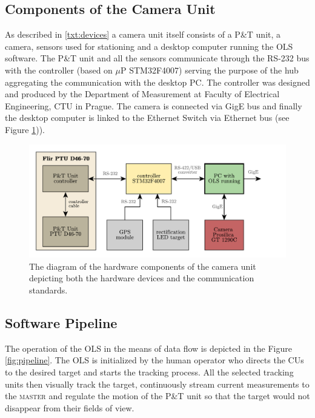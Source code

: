 \subsection{Components of the Camera Unit} \label{txt:components_of_cu}

As described in \ref{txt:devices} a camera unit itself consists of a P\&T unit, a camera, sensors used for stationing and a desktop computer running the OLS software. The P\&T unit and all the sensors communicate through the RS-232 bus with the controller (based on $\mu$P STM32F4007) serving the purpose of the hub aggregating the communication with the desktop PC. The controller was designed and produced by the Department of Measurement at Faculty of Electrical Engineering, CTU in Prague. The camera is connected via GigE bus and finally the desktop computer is linked to the Ethernet Switch via Ethernet bus (see Figure \ref{fig:hw_camera_unit})).

\begin{figure}[htb]
	\centering
	\includegraphics[width=0.8\linewidth]{fig/hw_camera_unit.pdf}
	\caption{The diagram of the hardware components of the camera unit depicting both the hardware devices and the communication standards.}
	\label{fig:hw_camera_unit}
\end{figure}

\subsection{Software Pipeline} \label{txt:sw_pipeline}

The operation of the OLS in the means of data flow is depicted in the Figure \ref{fig:pipeline}. The OLS is initialized by the human operator who directs the CUs to the desired target and starts the tracking process. All the selected tracking units then visually track the target, continuously stream current measurements to the \textsc{master} and regulate the motion of the P\&T unit so that the target would not disappear from their fields of view.

